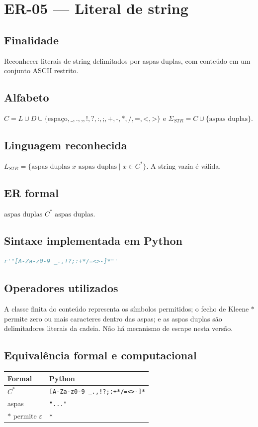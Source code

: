 \section{ER-05 --- Literal de string}
\subsection{Finalidade}
Reconhecer literais de string delimitados por aspas duplas, com conteúdo em um conjunto ASCII restrito.
\subsection{Alfabeto}
$C=L\cup D\cup\{\text{espaço},\texttt{\_},\texttt{.},\texttt{,},\texttt{!},\texttt{?},\texttt{:},\texttt{;},\texttt{+},\texttt{-},\texttt{*},\texttt{/},\texttt{=},\texttt{<},\texttt{>}\}$ e $\Sigma_{STR}=C\cup\{\text{aspas duplas}\}$.
\subsection{Linguagem reconhecida}
$L_{STR}=\{\text{aspas duplas }x\text{ aspas duplas}\mid x\in C^*\}$. A string vazia é válida.
\subsection{ER formal}
$\text{aspas duplas }C^*\text{ aspas duplas}$.
\subsection{Sintaxe implementada em Python}
\begin{lstlisting}[language=Python]
r'"[A-Za-z0-9 _.,!?;:+*/=<>-]*"'
\end{lstlisting}
\subsection{Operadores utilizados}
A classe finita do conteúdo representa os símbolos permitidos; o fecho de Kleene $*$ permite zero ou mais caracteres dentro das aspas; e as aspas duplas são delimitadores literais da cadeia. Não há mecanismo de escape nesta versão.
\subsection{Equivalência formal e computacional}
\begin{center}
\small
\begin{tabular}{|p{}|p{}|}
\toprule
Formal & Python \\
\midrule
$C^*$ & \texttt{[A-Za-z0-9 \_.,!?;:+*/=<>-]*} \\
aspas & \texttt{"..."} \\
$*$ permite $\varepsilon$ & \texttt{*} \\
\bottomrule
\end{tabular}
\end{center}
